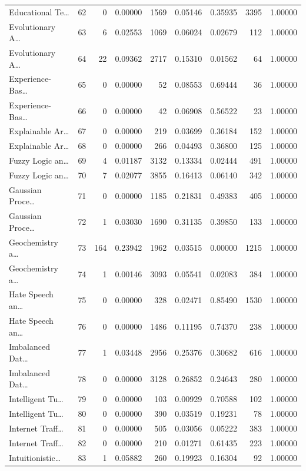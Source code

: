 \begin{table}
\begin{tabular}{lrrrrrrrr}
Educational Te… & 62 & 0 & 0.00000 & 1569 & 0.05146 & 0.35935 & 3395 & 1.00000 \\
Evolutionary A… & 63 & 6 & 0.02553 & 1069 & 0.06024 & 0.02679 & 112 & 1.00000 \\
Evolutionary A… & 64 & 22 & 0.09362 & 2717 & 0.15310 & 0.01562 & 64 & 1.00000 \\
Experience-Bas… & 65 & 0 & 0.00000 & 52 & 0.08553 & 0.69444 & 36 & 1.00000 \\
Experience-Bas… & 66 & 0 & 0.00000 & 42 & 0.06908 & 0.56522 & 23 & 1.00000 \\
Explainable Ar… & 67 & 0 & 0.00000 & 219 & 0.03699 & 0.36184 & 152 & 1.00000 \\
Explainable Ar… & 68 & 0 & 0.00000 & 266 & 0.04493 & 0.36800 & 125 & 1.00000 \\
Fuzzy Logic an… & 69 & 4 & 0.01187 & 3132 & 0.13334 & 0.02444 & 491 & 1.00000 \\
Fuzzy Logic an… & 70 & 7 & 0.02077 & 3855 & 0.16413 & 0.06140 & 342 & 1.00000 \\
Gaussian Proce… & 71 & 0 & 0.00000 & 1185 & 0.21831 & 0.49383 & 405 & 1.00000 \\
Gaussian Proce… & 72 & 1 & 0.03030 & 1690 & 0.31135 & 0.39850 & 133 & 1.00000 \\
Geochemistry a… & 73 & 164 & 0.23942 & 1962 & 0.03515 & 0.00000 & 1215 & 1.00000 \\
Geochemistry a… & 74 & 1 & 0.00146 & 3093 & 0.05541 & 0.02083 & 384 & 1.00000 \\
Hate Speech an… & 75 & 0 & 0.00000 & 328 & 0.02471 & 0.85490 & 1530 & 1.00000 \\
Hate Speech an… & 76 & 0 & 0.00000 & 1486 & 0.11195 & 0.74370 & 238 & 1.00000 \\
Imbalanced Dat… & 77 & 1 & 0.03448 & 2956 & 0.25376 & 0.30682 & 616 & 1.00000 \\
Imbalanced Dat… & 78 & 0 & 0.00000 & 3128 & 0.26852 & 0.24643 & 280 & 1.00000 \\
Intelligent Tu… & 79 & 0 & 0.00000 & 103 & 0.00929 & 0.70588 & 102 & 1.00000 \\
Intelligent Tu… & 80 & 0 & 0.00000 & 390 & 0.03519 & 0.19231 & 78 & 1.00000 \\
Internet Traff… & 81 & 0 & 0.00000 & 505 & 0.03056 & 0.05222 & 383 & 1.00000 \\
Internet Traff… & 82 & 0 & 0.00000 & 210 & 0.01271 & 0.61435 & 223 & 1.00000 \\
Intuitionistic… & 83 & 1 & 0.05882 & 260 & 0.19923 & 0.16304 & 92 & 1.00000 \\

\end{tabular}
\end{table}
